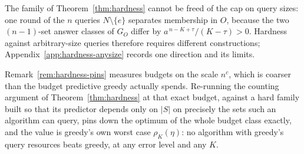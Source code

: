 \begin{remark}
\label{rem:hardness-leak}
The family of Theorem~\ref{thm:hardness} cannot be freed of the cap on
query sizes: one round of the $n$ queries $N\setminus\{e\}$ separates
membership in $O$, because the two $(n{-}1)$-set answer classes of $G_O$
differ by $a^{\,n-K+\tau}/(K-\tau)>0$.  Hardness against arbitrary-size
queries therefore requires different constructions;
Appendix~\ref{app:hardness-anysize} records one direction and its limits.
\end{remark}

Remark~\ref{rem:hardness-pins} measures budgets on the scale $n^{c}$, which
is coarser than the budget predictive greedy actually spends.  Re-running
the counting argument of Theorem~\ref{thm:hardness} at that exact budget,
against a hard family built so that its predictor depends only on $|S|$ on
precisely the sets such an algorithm can query, pins down the optimum of
the whole budget class exactly, and the value is greedy's own worst case
$\rho_K(\eta)$: no algorithm with greedy's query resources beats greedy,
at any error level and any $K$.

